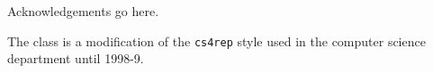 \begin{acknowledgements}
  Acknowledgements go here. 
  
  The class is a modification of the {\tt cs4rep} style 
  used in the computer science department until 1998-9.
\end{acknowledgements}